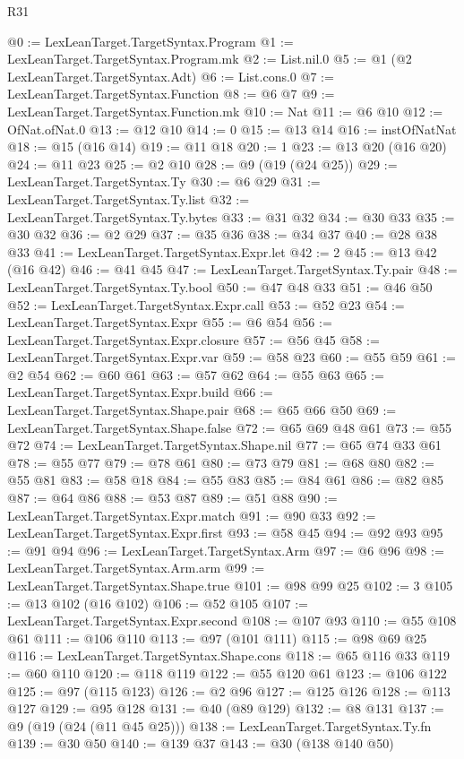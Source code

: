 \begin{lexlean}{R31}
\begin{coremodule}
@0 := LexLeanTarget.TargetSyntax.Program
@1 := LexLeanTarget.TargetSyntax.Program.mk
@2 := List.nil.{0}
@5 := @1 (@2 LexLeanTarget.TargetSyntax.Adt)
@6 := List.cons.{0}
@7 := LexLeanTarget.TargetSyntax.Function
@8 := @6 @7
@9 := LexLeanTarget.TargetSyntax.Function.mk
@10 := Nat
@11 := @6 @10
@12 := OfNat.ofNat.{0}
@13 := @12 @10
@14 := 0
@15 := @13 @14
@16 := instOfNatNat
@18 := @15 (@16 @14)
@19 := @11 @18
@20 := 1
@23 := @13 @20 (@16 @20)
@24 := @11 @23
@25 := @2 @10
@28 := @9 (@19 (@24 @25))
@29 := LexLeanTarget.TargetSyntax.Ty
@30 := @6 @29
@31 := LexLeanTarget.TargetSyntax.Ty.list
@32 := LexLeanTarget.TargetSyntax.Ty.bytes
@33 := @31 @32
@34 := @30 @33
@35 := @30 @32
@36 := @2 @29
@37 := @35 @36
@38 := @34 @37
@40 := @28 @38 @33
@41 := LexLeanTarget.TargetSyntax.Expr.let
@42 := 2
@45 := @13 @42 (@16 @42)
@46 := @41 @45
@47 := LexLeanTarget.TargetSyntax.Ty.pair
@48 := LexLeanTarget.TargetSyntax.Ty.bool
@50 := @47 @48 @33
@51 := @46 @50
@52 := LexLeanTarget.TargetSyntax.Expr.call
@53 := @52 @23
@54 := LexLeanTarget.TargetSyntax.Expr
@55 := @6 @54
@56 := LexLeanTarget.TargetSyntax.Expr.closure
@57 := @56 @45
@58 := LexLeanTarget.TargetSyntax.Expr.var
@59 := @58 @23
@60 := @55 @59
@61 := @2 @54
@62 := @60 @61
@63 := @57 @62
@64 := @55 @63
@65 := LexLeanTarget.TargetSyntax.Expr.build
@66 := LexLeanTarget.TargetSyntax.Shape.pair
@68 := @65 @66 @50
@69 := LexLeanTarget.TargetSyntax.Shape.false
@72 := @65 @69 @48 @61
@73 := @55 @72
@74 := LexLeanTarget.TargetSyntax.Shape.nil
@77 := @65 @74 @33 @61
@78 := @55 @77
@79 := @78 @61
@80 := @73 @79
@81 := @68 @80
@82 := @55 @81
@83 := @58 @18
@84 := @55 @83
@85 := @84 @61
@86 := @82 @85
@87 := @64 @86
@88 := @53 @87
@89 := @51 @88
@90 := LexLeanTarget.TargetSyntax.Expr.match
@91 := @90 @33
@92 := LexLeanTarget.TargetSyntax.Expr.first
@93 := @58 @45
@94 := @92 @93
@95 := @91 @94
@96 := LexLeanTarget.TargetSyntax.Arm
@97 := @6 @96
@98 := LexLeanTarget.TargetSyntax.Arm.arm
@99 := LexLeanTarget.TargetSyntax.Shape.true
@101 := @98 @99 @25
@102 := 3
@105 := @13 @102 (@16 @102)
@106 := @52 @105
@107 := LexLeanTarget.TargetSyntax.Expr.second
@108 := @107 @93
@110 := @55 @108 @61
@111 := @106 @110
@113 := @97 (@101 @111)
@115 := @98 @69 @25
@116 := LexLeanTarget.TargetSyntax.Shape.cons
@118 := @65 @116 @33
@119 := @60 @110
@120 := @118 @119
@122 := @55 @120 @61
@123 := @106 @122
@125 := @97 (@115 @123)
@126 := @2 @96
@127 := @125 @126
@128 := @113 @127
@129 := @95 @128
@131 := @40 (@89 @129)
@132 := @8 @131
@137 := @9 (@19 (@24 (@11 @45 @25)))
@138 := LexLeanTarget.TargetSyntax.Ty.fn
@139 := @30 @50
@140 := @139 @37
@143 := @30 (@138 @140 @50)

\end{coremodule}
\end{lexlean}
